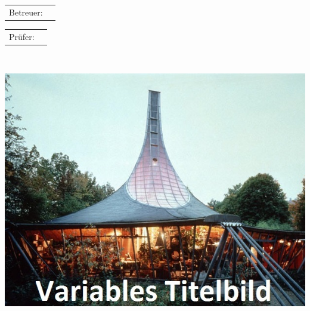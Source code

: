 \begin{titlepage}
\begin{minipage}[c]{105mm}
		\vspace{5mm}
		\hspace{-3.0mm} 
		\begin{tabular}{p{2.5cm}l}
			\textsf{Betreuer:}&\textsf{\Betreuer} \\ 
		\end{tabular}
		
		\vspace{5mm}
		\hspace{-3.0mm} 
		\begin{tabular}{p{2.5cm}l}
			\textsf{Prüfer:}&\textsf{\Pruefer}	\\
		\end{tabular}
		
		\vspace{11mm}
		\textsf{\EndeMonat~\EndeJahr}
		
		\begin{minipage}[t][10.5cm][c]{\textwidth}
			\includegraphics[width=1.0\textwidth]{Titelbild.jpg}
		\end{minipage}
	
	
		\vspace{10mm}
		

\end{minipage}
\end{titlepage}
